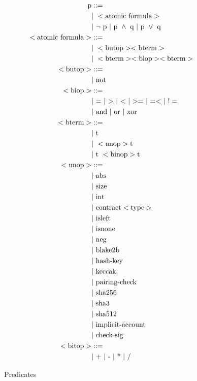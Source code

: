 \documentclass[runningheads]{llncs}
\begin{document}
\begin{figure}[h]
\begin{align*}
\text{p} &::= \\
   &\text{$\mid$}\ < \text{atomic formula} > \\
   &\text{$\mid$}\ \neg\ \text{p} \
   \text{$\mid$}\ \text{p}\ \wedge\ \text{q} \
   \text{$\mid$}\ \text{p}\ \vee\ \text{q} \\
< \text{atomic formula} > &::= \\ 
    &\text{$\mid$}\ < \text{butop} > < \text{bterm} >\\ 
   &\text{$\mid$}\  < \text{bterm} >  < \text{biop} > < \text{bterm} >\\ 
< \text{butop} > &::= \\
   &\text{$\mid$}\ \text{not} \\
< \text{biop} > &::= \\
   &\text{$\mid$}\ \text{$=$} \
   \text{$\mid$}\ \text{$>$} \
   \text{$\mid$}\ \text{$<$} \
   \text{$\mid$}\ \text{$>=$} \
   \text{$\mid$}\ \text{$=<$} \
   \text{$\mid$}\ \text{$!=$} \\
   &\text{$\mid$}\ \text{and}\ \text{$\mid$}\ \text{or}\ \text{$\mid$}\ \text{xor}\\
< \text{bterm} > &::= \\ 
   &\text{$\mid$}\ \text{t} \\
   &\text{$\mid$}\ < \text{unop} > \text{t} \\ 
   &\text{$\mid$}\ \text{t}\ < \text{binop} > \text{t}\\  
< \text{unop} > &::= \\ 
   &\text{$\mid$}\ \text{abs} \\
   &\text{$\mid$}\ \text{size} \\
   &\text{$\mid$}\ \text{int} \\
   &\text{$\mid$}\ \text{contract}  < \text{type} > \\
   &\text{$\mid$}\ \text{isleft} \\
   &\text{$\mid$}\ \text{isnone} \\
   &\text{$\mid$}\ \text{neg} \\
   &\text{$\mid$}\ \text{blake2b} \\
   &\text{$\mid$}\ \text{hash-key} \\
   &\text{$\mid$}\ \text{keccak} \\
   &\text{$\mid$}\ \text{pairing-check} \\
   &\text{$\mid$}\ \text{sha256} \\
   &\text{$\mid$}\ \text{sha3} \\
   &\text{$\mid$}\ \text{sha512} \\
   &\text{$\mid$}\ \text{implicit-account} \\
   &\text{$\mid$}\ \text{check-sig} \\
< \text{bitop} > &::= \\ 
   &\text{$\mid$}\ \text{+}\ \text{$\mid$}\ \text{-}\ \text{$\mid$}\ \text{*}\ \text{$\mid$}\ \text{/}
\end{align*}
\caption{Predicates}
\label{fig:predicate}
\end{figure}
\end{document}
